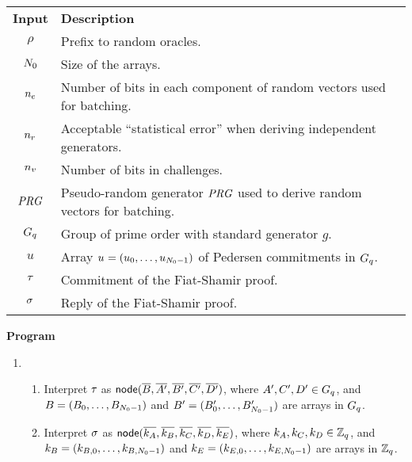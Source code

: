 \documentclass[11pt]{article}
\begin{document}
\begin{nicebox}
  \begin{algorithm}$\quad$\label{algo:pos}\\

    \vspace{-0.3cm}
    \hspace{-0.3cm}
    \begin{tabular}{cl}
      \textbf{Input} & \textbf{Description}\\
      $\rho$ & Prefix to random oracles.\\
      $N_{0}$ & Size of the arrays.\\
      ${n_e}$ & Number of bits in each component of random
      vectors used for batching.\\
      $n_r$ & Acceptable ``statistical error'' when deriving independent generators.\\
      $n_v$ & Number of bits in challenges.\\
      $\mathit{PRG}$ & Pseudo-random generator $\mathit{PRG}$ used to derive random
      vectors for batching.\\
      $G_{q}$ & Group of prime order with standard generator $g$.\\ 
      $u$ & Array $u_{}=(u_{0},\ldots,u_{N_{0}-1})$ of Pedersen commitments in
      $G_{q}$.\\
      $\tau_{}$ & Commitment of the Fiat-Shamir proof.\\
      $\sigma_{}$ & Reply of the Fiat-Shamir proof.
    \end{tabular}

    \vspace{0.2cm}
    \noindent
    \textbf{Program}

    \vspace{-0.3cm}
  \begin{enumerate}

  \item 
    \begin{enumerate}
    \item Interpret $\tau_{}$ as
      $\textsf{node}(\overline{B},\overline{A'},\overline{B'},\overline{C'},\overline{D'})$, where
      $A',C',D'\in G_{q}$, and $B=(B_0,\ldots,B_{N_{0}-1})$ and
      $B'=(B_0',\ldots,B_{N_{0}-1}')$ are arrays in $G_{q}$.

  \item Interpret $\sigma_{}$ as
    $\textsf{node}(\overline{k_A},\overline{k_B},\overline{k_C},\overline{k_D},\overline{k_E})$, where
    $k_A,k_C,k_D\in\mathbb{Z}_{q}$, and $k_B=(k_{B,0},\ldots,k_{B,N_{0}-1})$ and
    $k_E=(k_{E,0},\ldots,k_{E,N_{0}-1})$ are arrays in $\mathbb{Z}_{q}$.


\end{enumerate}
\end{enumerate}
\end{algorithm}
\end{nicebox}
\end{document}
